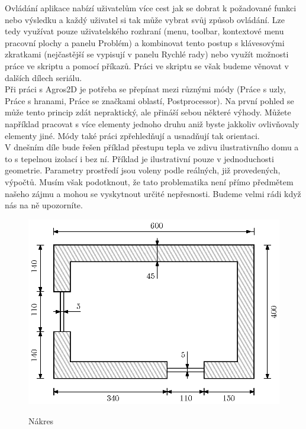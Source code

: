 \documentclass[a4paper, oneside]{article}
\begin{document}
	Ovládání aplikace nabízí uživatelům více cest jak se dobrat k požadované funkci nebo výsledku a každý uživatel si tak může vybrat svůj způsob ovládání. Lze tedy využívat pouze uživatelského rozhraní (menu, toolbar, kontextové menu pracovní plochy a panelu Problém) a kombinovat tento postup s klávesovými zkratkami (nejčastější se vypisují v panelu Rychlé rady) nebo využít možnosti práce ve skriptu a pomocí příkazů. Práci ve skriptu se však budeme věnovat v dalších dílech seriálu.\\
	Při práci s Agros2D je potřeba se přepínat mezi různými módy (Práce s uzly, Práce s hranami, Práce se značkami oblastí, Postprocessor). Na první pohled se může tento princip zdát nepraktický, ale přináší sebou některé výhody. Můžete například pracovat s více elementy jednoho druhu aniž byste jakkoliv ovlivňovaly elementy jiné. Módy také práci zpřehledňují a usnadňují tak orientaci.\\
	V dnešním díle bude řešen příklad přestupu tepla ve zdivu ilustrativního domu a to s tepelnou izolací i bez ní. Příklad je ilustrativní pouze v jednoduchosti geometrie. Parametry prostředí jsou voleny podle reálných, již provedených, výpočtů. Musím však podotknout, že tato problematika není přímo předmětem našeho zájmu a mohou se vyskytnout určité nepřesnosti. Budeme velmi rádi když nás na ně upozorníte.\\

\begin{figure}[htbp]
\centering
\includegraphics{Nakres.png}\\
\caption{Nákres}
\end{figure}
\end{document}
